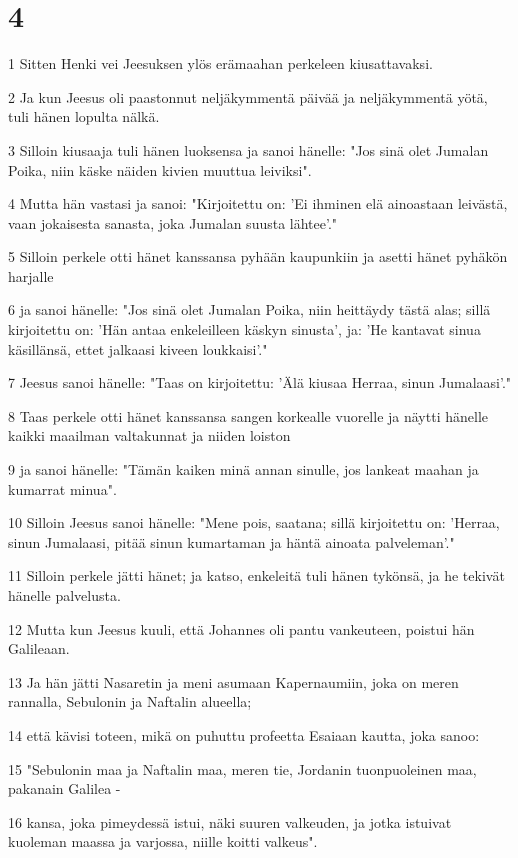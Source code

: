 \chapter{4}

\par 1 Sitten Henki vei Jeesuksen ylös erämaahan perkeleen kiusattavaksi.
\par 2 Ja kun Jeesus oli paastonnut neljäkymmentä päivää ja neljäkymmentä yötä, tuli hänen lopulta nälkä.
\par 3 Silloin kiusaaja tuli hänen luoksensa ja sanoi hänelle: "Jos sinä olet Jumalan Poika, niin käske näiden kivien muuttua leiviksi".
\par 4 Mutta hän vastasi ja sanoi: "Kirjoitettu on: 'Ei ihminen elä ainoastaan leivästä, vaan jokaisesta sanasta, joka Jumalan suusta lähtee'."
\par 5 Silloin perkele otti hänet kanssansa pyhään kaupunkiin ja asetti hänet pyhäkön harjalle
\par 6 ja sanoi hänelle: "Jos sinä olet Jumalan Poika, niin heittäydy tästä alas; sillä kirjoitettu on: 'Hän antaa enkeleilleen käskyn sinusta', ja: 'He kantavat sinua käsillänsä, ettet jalkaasi kiveen loukkaisi'."
\par 7 Jeesus sanoi hänelle: "Taas on kirjoitettu: 'Älä kiusaa Herraa, sinun Jumalaasi'."
\par 8 Taas perkele otti hänet kanssansa sangen korkealle vuorelle ja näytti hänelle kaikki maailman valtakunnat ja niiden loiston
\par 9 ja sanoi hänelle: "Tämän kaiken minä annan sinulle, jos lankeat maahan ja kumarrat minua".
\par 10 Silloin Jeesus sanoi hänelle: "Mene pois, saatana; sillä kirjoitettu on: 'Herraa, sinun Jumalaasi, pitää sinun kumartaman ja häntä ainoata palveleman'."
\par 11 Silloin perkele jätti hänet; ja katso, enkeleitä tuli hänen tykönsä, ja he tekivät hänelle palvelusta.
\par 12 Mutta kun Jeesus kuuli, että Johannes oli pantu vankeuteen, poistui hän Galileaan.
\par 13 Ja hän jätti Nasaretin ja meni asumaan Kapernaumiin, joka on meren rannalla, Sebulonin ja Naftalin alueella;
\par 14 että kävisi toteen, mikä on puhuttu profeetta Esaiaan kautta, joka sanoo:
\par 15 "Sebulonin maa ja Naftalin maa, meren tie, Jordanin tuonpuoleinen maa, pakanain Galilea -
\par 16 kansa, joka pimeydessä istui, näki suuren valkeuden, ja jotka istuivat kuoleman maassa ja varjossa, niille koitti valkeus".
